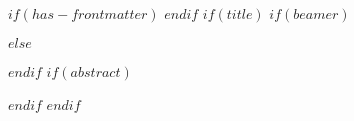 $if(has-frontmatter)$
\frontmatter
$endif$
$if(title)$
$if(beamer)$
\maketitle
$else$
\maketitle
$endif$
$if(abstract)$
\begin{abstract}
$abstract$
\end{abstract}
$endif$
$endif$